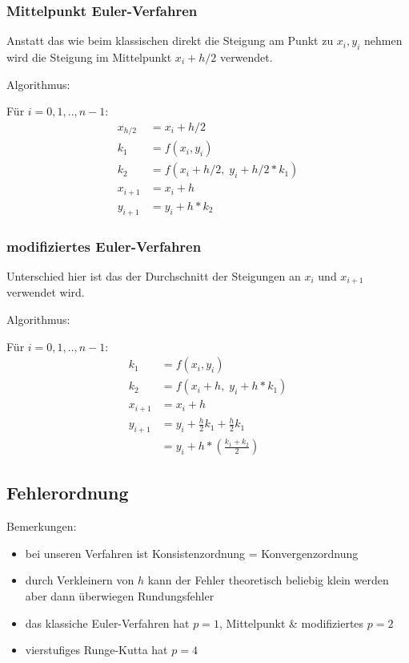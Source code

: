 \subsubsection{Mittelpunkt Euler-Verfahren}

Anstatt das wie beim klassischen direkt die Steigung am Punkt zu $x_i, y_i$ nehmen
wird die Steigung im Mittelpunkt $x_i + h/2$ verwendet.


\begingroup
\addtolength{\jot}{0.5em}
\large
Algorithmus:

Für $i = 0,1,..,n-1$:
\begin{align*}
	x_{h/2} & = x_i + h/2                        \\
	k_1     & = f(x_i, y_i)                      \\
	k_2     & = f(x_i + h/2, \; y_i + h/2 * k_1) \\
	x_{i+1} & = x_i + h                          \\
	y_{i+1} & = y_i + h * k_2
\end{align*}
\endgroup


\subsubsection{modifiziertes Euler-Verfahren}

Unterschied hier ist das der Durchschnitt der Steigungen an $x_i$ und $x_{i+1}$
verwendet wird.

\begingroup
\addtolength{\jot}{0.5em}
\large
Algorithmus:

Für $i = 0,1,..,n-1$:
\begin{align*}
	k_1     & = f(x_i, y_i)                                \\
	k_2     & = f(x_i + h, \; y_i + h * k_1)               \\
	x_{i+1} & = x_i + h                                    \\
	y_{i+1} & = y_i + \frac{h}{2} k_1 + \frac{h}{2} k_1    \\
	        & = y_i + h * \left(\frac{k_1 + k_2}{2}\right)
\end{align*}
\endgroup



\subsection{Fehlerordnung}

Bemerkungen:
\begin{itemize}
	\item bei unseren Verfahren ist Konsistenzordnung = Konvergenzordnung
	\item durch Verkleinern von $h$ kann der Fehler theoretisch beliebig klein
	      werden aber dann überwiegen Rundungsfehler
	\item das klassiche Euler-Verfahren hat $p=1$, Mittelpunkt \& modifiziertes
	      $p=2$
	\item vierstufiges Runge-Kutta hat $p=4$
\end{itemize}

